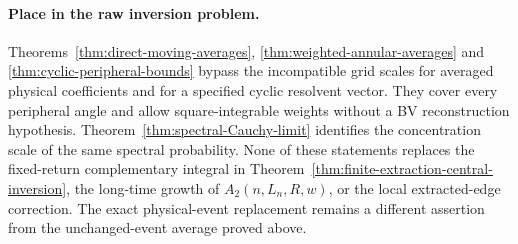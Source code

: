 \paragraph{Place in the raw inversion problem.}
Theorems~\ref{thm:direct-moving-averages},
\ref{thm:weighted-annular-averages} and
\ref{thm:cyclic-peripheral-bounds} bypass the incompatible grid scales
for averaged physical coefficients and for a specified cyclic
resolvent vector. They cover every peripheral angle and allow
square-integrable weights without a BV reconstruction hypothesis.
Theorem~\ref{thm:spectral-Cauchy-limit} identifies the concentration
scale of the same spectral probability. None of these statements
replaces the fixed-return complementary integral in
Theorem~\ref{thm:finite-extraction-central-inversion}, the long-time growth of
$A_2(n,L_n,R,w)$, or the local extracted-edge correction. The exact
physical-event replacement remains a different assertion from the
unchanged-event average proved above.
